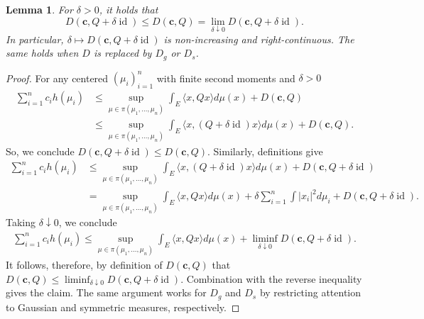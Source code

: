 \documentclass[10pt]{article}
\newtheorem{lemma}[theorem]{Lemma}
\newcommand{\id}{\operatorname{id}}
\begin{document}
\begin{lemma}\label{lem:PropertiesD} For $\delta>0$, it holds that  
$$D(\mathbf{c},Q+ \delta \id) \leq D(\mathbf{c},Q ) = \lim_{\delta \downarrow 0} D(\mathbf{c},Q+ \delta \id).$$
In particular, $\delta \mapsto D(\mathbf{c},Q+ \delta \id)$ is non-increasing and right-continuous.  The same holds when $D$ is replaced by $D_g$ or $D_s$.
\end{lemma}
 \begin{proof}
For any centered $(\mu_i)_{i=1}^n$ with finite second moments and $\delta>0$
\begin{align*}
\sum_{i=1}^n c_i h(\mu_i)  &\leq \sup_{\mu \in \pi(\mu_1, \dots, \mu_n)}  \int_E \langle x, Q   x\rangle d\mu(x) + D(\mathbf{c},Q)\\
&\leq \sup_{\mu \in \pi(\mu_1, \dots, \mu_n)}  \int_E \langle x, (Q+\delta \id) x\rangle d\mu(x)   + D(\mathbf{c},Q).
\end{align*}
So, we conclude $D(\mathbf{c},Q+\delta \id)\leq D(\mathbf{c},Q)$.  Similarly, definitions give
\begin{align*}
\sum_{i=1}^n c_i h(\mu_i)  &\leq \sup_{\mu \in \pi(\mu_1, \dots, \mu_n)}  \int_E \langle x, (Q+\delta \id)  x\rangle d\mu(x) + D(\mathbf{c},Q+\delta \id)\\
&= \sup_{\mu \in \pi(\mu_1, \dots, \mu_n)}  \int_E \langle x, Q x\rangle d\mu(x) + \delta\sum_{i=1}^n \int |x_i|^2 d\mu_i + D(\mathbf{c},Q+\delta \id).
\end{align*}
Taking $\delta\downarrow 0$, we conclude
\begin{align*}
\sum_{i=1}^n c_i h(\mu_i)  \leq  \sup_{\mu \in \pi(\mu_1, \dots, \mu_n)}  \int_E \langle x, Q x\rangle d\mu(x) + \liminf_{\delta \downarrow 0}D(\mathbf{c},Q+\delta \id). 
\end{align*}
It follows, therefore,  by  definition of $D(\mathbf{c},Q )$ that $D(\mathbf{c},Q ) \leq \liminf_{\delta \downarrow 0} D(\mathbf{c},Q+ \delta \id)$. Combination with the reverse inequality gives the claim.  The same argument works for $D_g$ and $D_s$ by restricting attention to Gaussian and symmetric measures, respectively.
\end{proof}
\end{document}
